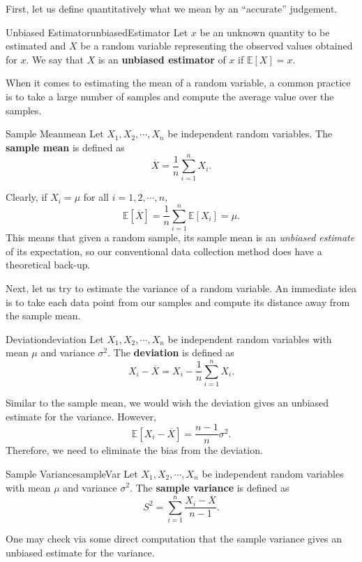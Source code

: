 \documentclass[math]{amznotes}
\theoremstyle{remark}
\newcommand{\0}{\mathbf{0}}
\newcommand{\1}{\mathbf{1}}
\begin{document}
First, let us define quantitatively what we mean by an ``accurate'' judgement.
\begin{dfnbox}{Unbiased Estimator}{unbiasedEstimator}
    Let $x$ be an unknown quantity to be estimated and $X$ be a random variable representing the observed values obtained for $x$. We say that $X$ is an {\color{red} \textbf{unbiased estimator}} of $x$ if $\mathbb{E}\left[X\right] = x$.
\end{dfnbox}
When it comes to estimating the mean of a random variable, a common practice is to take a large number of samples and compute the average value over the samples.
\begin{dfnbox}{Sample Mean}{mean}
    Let $X_1, X_2, \cdots, X_n$ be independent random variables. The {\color{red} \textbf{sample mean}} is defined as
    \begin{equation*}
        \overline{X} = \frac{1}{n}\sum_{i = 1}^{n}X_i.
    \end{equation*}
\end{dfnbox}
Clearly, if $X_i = \mu$ for all $i = 1, 2, \cdots, n$,
\begin{equation*}
    \mathbb{E}\left[\overline{X}\right] = \frac{1}{n}\sum_{i = 1}^{n}\mathbb{E}[X_i] = \mu.
\end{equation*}
This means that given a random sample, its sample mean is an \textit{unbiased estimate} of its expectation, so our conventional data collection method does have a theoretical back-up.

Next, let us try to estimate the variance of a random variable. An immediate idea is to take each data point from our samples and compute its distance away from the sample mean.
\begin{dfnbox}{Deviation}{deviation}
    Let $X_1, X_2, \cdots, X_n$ be independent random variables with mean $\mu$ and variance $\sigma^2$. The {\color{red} \textbf{deviation}} is defined as
    \begin{equation*}
        X_i - \overline{X} = X_i - \frac{1}{n}\sum_{i = 1}^{n}X_i.
    \end{equation*}
\end{dfnbox}
Similar to the sample mean, we would wish the deviation gives an unbiased estimate for the variance. However, 
\begin{equation*}
    \mathbb{E}\left[X_i - \overline{X}\right] = \frac{n - 1}{n}\sigma^2.
\end{equation*}
Therefore, we need to eliminate the bias from the deviation.
\begin{dfnbox}{Sample Variance}{sampleVar}
    Let $X_1, X_2, \cdots, X_n$ be independent random variables with mean $\mu$ and variance $\sigma^2$. The {\color{red} \textbf{sample variance}} is defined as
    \begin{equation*}
        S^2 = \sum_{i = 1}^{n}\frac{X_i - \overline{X}}{n - 1}.
    \end{equation*}
\end{dfnbox}
One may check via some direct computation that the sample variance gives an unbiased estimate for the variance.
\end{document}
